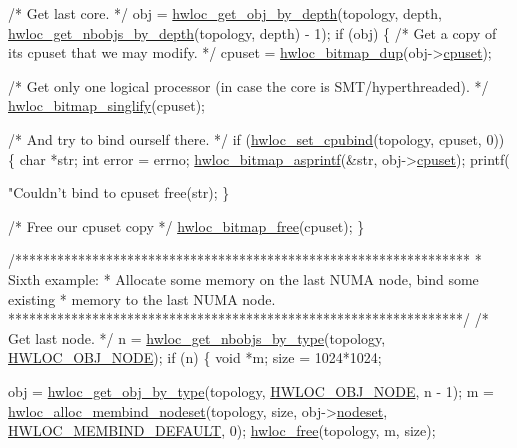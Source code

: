 \begin{DoxyCodeInclude}
{{{{{    \textcolor{comment}{/* Get last core. */}
    obj = \hyperlink{a00047_gaedd78240b0c1108355586a268ec5a697}{hwloc_get_obj_by_depth}(topology, depth,
                   \hyperlink{a00046_ga20cfe2456f4cfdd789c9aca6d2fdd69f}{hwloc_get_nbobjs_by_depth}(topology, depth) - 1);
    \textcolor{keywordflow}{if} (obj) \{
        \textcolor{comment}{/* Get a copy of its cpuset that we may modify. */}
        cpuset = \hyperlink{a00065_gaaa4ed76211cd3694dfbea2109fc440be}{hwloc_bitmap_dup}(obj->\hyperlink{a00016_a67925e0f2c47f50408fbdb9bddd0790f}{cpuset});

        \textcolor{comment}{/* Get only one logical processor (in case the core is}
\textcolor{comment}{           SMT/hyperthreaded). */}
        \hyperlink{a00065_ga4630aa1b7e08eac5b41be126194e84a1}{hwloc_bitmap_singlify}(cpuset);

        \textcolor{comment}{/* And try to bind ourself there. */}
        \textcolor{keywordflow}{if} (\hyperlink{a00049_gaf4cc194d5c0d38004a21b9f03522a7e3}{hwloc_set_cpubind}(topology, cpuset, 0)) \{
            \textcolor{keywordtype}{char} *str;
            \textcolor{keywordtype}{int} error = errno;
            \hyperlink{a00065_gad3cf87ceb58aa91656756bbb58057320}{hwloc_bitmap_asprintf}(&str, obj->\hyperlink{a00016_a67925e0f2c47f50408fbdb9bddd0790f}{cpuset});
            printf(\textcolor{stringliteral}{"Couldn't bind to cpuset %
            free(str);
        \}

        \textcolor{comment}{/* Free our cpuset copy */}
        \hyperlink{a00065_ga8e7035fe555ef96921bfb98e08519bc7}{hwloc_bitmap_free}(cpuset);
    \}

    \textcolor{comment}{/*****************************************************************}
\textcolor{comment}{     * Sixth example:}
\textcolor{comment}{     * Allocate some memory on the last NUMA node, bind some existing}
\textcolor{comment}{     * memory to the last NUMA node.}
\textcolor{comment}{     *****************************************************************/}
    \textcolor{comment}{/* Get last node. */}
    n = \hyperlink{a00046_gaba821f84ef64282d14577066e6d6547e}{hwloc_get_nbobjs_by_type}(topology, \hyperlink{a00041_ggacd37bb612667dc437d66bfb175a8dc55aaf0964881117bdedf1a5e9332cd120dd}{HWLOC_OBJ_NODE});
    \textcolor{keywordflow}{if} (n) \{
        \textcolor{keywordtype}{void} *m;
        size = 1024*1024;

        obj = \hyperlink{a00047_ga9be4a03488cdd0fb431e4aa1cbdea895}{hwloc_get_obj_by_type}(topology, \hyperlink{a00041_ggacd37bb612667dc437d66bfb175a8dc55aaf0964881117bdedf1a5e9332cd120dd}{HWLOC_OBJ_NODE}, n - 1);
        m = \hyperlink{a00050_gaeaa00714a9c4319bda0a74ca6f8720e8}{hwloc_alloc_membind_nodeset}(topology, size, obj->\hyperlink{a00016_a08f0d0e16c619a6e653526cbee4ffea3}{nodeset},
                \hyperlink{a00050_ggac9764f79505775d06407b40f5e4661e8a18675bb80ebc1bce5b652e9de8f3998c}{HWLOC_MEMBIND_DEFAULT}, 0);
        \hyperlink{a00050_ga986d9b4cc76da592c4b937c6cb7d9d56}{hwloc_free}(topology, m, size);

}}}}}}
\end{DoxyCodeInclude}
